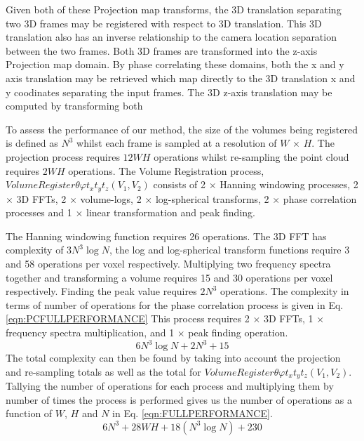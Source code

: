 Given both of these Projection map transforms, the 3D translation separating two 3D frames may be registered with respect to 3D translation. This 3D translation also has an inverse relationship to the camera location separation between the two frames. Both 3D frames are transformed into the z-axis Projection map domain. By phase correlating these domains, both the x and y axis translation may be retrieved which map directly to the 3D translation x and y coodinates separating the input frames. The 3D z-axis translation may be computed by transforming both 


To assess the performance of our method, the size of the volumes being registered is defined as $N^3$ whilst each frame is sampled at a resolution of $W$ $\times$ $H$. The projection process requires $12WH$ operations whilst re-sampling the point cloud requires $2WH$ operations. The Volume Registration process, $VolumeRegister{\theta \varphi t_x t_y t_z}(V_1, V_2)$ consists of 2 $\times$ Hanning windowing processes, 2 $\times$ 3D FFTs, 2 $\times$ volume-logs, 2 $\times$ log-spherical transforms, 2 $\times$ phase correlation processes and 1 $\times$ linear transformation and peak finding. 

The Hanning windowing function requires 26 operations. The 3D FFT has complexity of $3N^3\log{N}$, the log and log-spherical transform functions require 3 and 58 operations per voxel respectively. Multiplying two frequency spectra together and transforming a volume requires 15 and 30 operations per voxel respectively. Finding the peak value requires $2N^3$ operations. The complexity in terms of number of operations for the phase correlation process is given in Eq. \ref{eqn:PCFULLPERFORMANCE} This process requires 2 $\times$ 3D FFTs, 1 $\times$ frequency spectra multiplication, and 1 $\times$ peak finding operation. 
\begin{equation} \label{eqn:PCFULLPERFORMANCE}
6N^3\log{N} + 2N^3 + 15
\end{equation}
The total complexity can then be found by taking into account the projection and re-sampling totals as well as the total for $VolumeRegister{\theta \varphi t_x t_y t_z}(V_1, V_2)$. Tallying the number of operations for each process and multiplying them by number of times the process is performed gives us the number of operations as a function of $W$, $H$ and $N$ in Eq. \ref{eqn:FULLPERFORMANCE}.
\begin{equation} \label{eqn:FULLPERFORMANCE}
6N^3 + 28WH + 18(N^3\log{N}) + 230
\end{equation}

